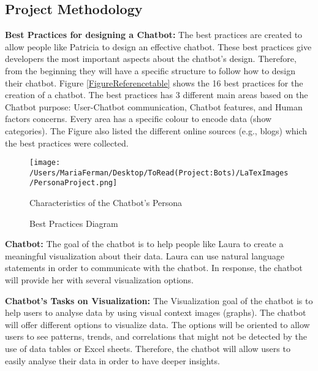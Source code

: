 \documentclass[a4paper,10pt]{article}
\begin{document}
\subsection*{Project Methodology}

\textbf{Best Practices for designing a Chatbot:} The best practices are created to allow people like Patricia to design an effective chatbot. These best practices give developers the most important aspects about the chatbot's design. Therefore, from the beginning they will have a specific structure to follow how to design their chatbot. Figure \ref{FigureReferencetable} shows the 16 best practices for the creation of a chatbot. The best practices has 3 different main areas based on the Chatbot purpose: User-Chatbot communication, Chatbot features, and Human factors concerns. Every area has a specific colour to encode data (show categories). The Figure also listed the different online sources (e.g., blogs) which the best practices were collected. 

\begin{figure}
\centering
\texttt{[image: /Users/MariaFerman/Desktop/ToRead(Project:Bots)/LaTexImages/PersonaProject.png]}
\caption{Characteristics of the Chatbot's Persona}
\label{FigureLaura}
\end{figure}

\begin{figure}[p]
    \caption{Best Practices Diagram}
    \label{FigureBestPracticeDiagram}
\end{figure}

\textbf{Chatbot:} The goal of the chatbot is to help people like Laura to create a meaningful visualization about their data. Laura can use natural language statements in order to communicate with the chatbot. In response, the chatbot will provide her with several visualization options.

\textbf{Chatbot's Tasks on Visualization:} The Visualization goal of the chatbot is to help users to analyse data by using visual context images (graphs). The chatbot will offer different options to visualize data. The options will be oriented to allow users to see patterns, trends, and correlations that might not be detected by the use of data tables or Excel sheets. Therefore, the chatbot will allow users to easily analyse their data in order to have deeper insights.  
\end{document}
